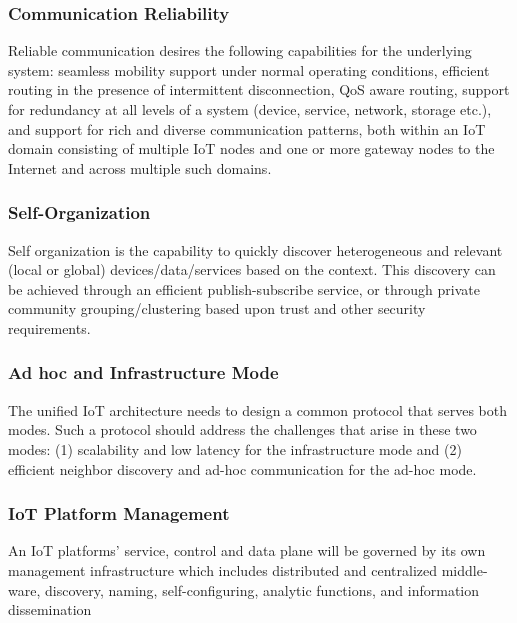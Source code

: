\subsubsection{Communication Reliability
}Reliable communication desires the following capabilities for the underlying system:  seamless mobility support under normal operating conditions,  efficient routing in the presence of intermittent disconnection,  QoS aware routing,  support for redundancy at all levels of a system (device, service, network, storage etc.), and support for rich and diverse communication patterns, both within an IoT domain consisting of multiple IoT nodes and one or more gateway nodes to the Internet and across multiple such domains. 
\subsubsection{Self-Organization
} Self organization is the capability to quickly discover heterogeneous and relevant (local or global) devices/data/services based on the context. This discovery can be achieved through an efficient publish-subscribe service, or through private community grouping/clustering based upon trust and other security requirements. 
\subsubsection{Ad hoc and Infrastructure Mode
}The unified IoT architecture needs to design a common protocol that serves both modes. Such a protocol should address the challenges that arise in these two modes: (1) scalability and low latency for the infrastructure mode and (2) efficient neighbor discovery and ad-hoc communication for the ad-hoc mode.  
\subsubsection{IoT Platform Management
}An IoT platforms' service, control and data plane will be governed by its own management infrastructure which includes distributed and centralized middle-ware, discovery, naming, self-configuring, analytic functions, and information dissemination



